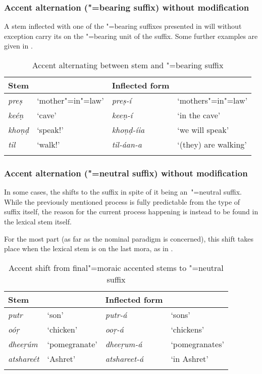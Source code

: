 \subsubsection*{Accent alternation ("=bearing suffix) without modification}

A stem inflected with one of the "=bearing suffixes presented in  will without
exception carry its  on the "=bearing unit of the suffix. Some further examples are given in .


\begin{table}[h]
\caption{ Accent alternating between stem and "=bearing suffix}
\begin{tabularx}{\textwidth}{ l@{\hspace{25pt}} Q l@{\hspace{25pt}} Q }
\lsptoprule
Stem &
&
Inflected form &
\\\midrule
\textit{preṣ} &
`mother"=in"=law' &
\textit{preṣ-í} &
`mothers"=in"=law'\\
\textit{keéṇ} &
`cave' &
\textit{keeṇ-í} &
`in the cave'\\
\textit{khoṇḍ} &
`speak!' &
\textit{khoṇḍ-íia} &
`we will speak'\\
\textit{til} &
`walk!' &
\textit{til-áan-a} &
`(they) are walking'\\\lspbottomrule
\end{tabularx}
\label{tab:3-8}
\end{table}

\subsubsection*{Accent alternation ("=neutral suffix) without modification}

In some cases, the  shifts to the suffix in spite of it being an~"=neutral suffix. While
the previously mentioned process is fully predictable from the type of suffix itself, the reason for
the current process happening is instead to be found in the lexical stem itself.


For the most part (as far as the nominal paradigm is concerned), this shift takes place when the
lexical stem  is on the last mora, as in .



\begin{table}[p] 
\caption{ Accent shift from final"=moraic accented stems to "=neutral suffix}
\begin{tabularx}{\textwidth}{XXXX}
\lsptoprule
Stem &
&
Inflected form &
\\\midrule
\textit{putr} &
`son' &
\textit{putr-á} &
`sons'\\
\textit{oóṛ} &
`chicken' &
\textit{ooṛ-á} &
`chickens'\\
\textit{dheeṛúm} &
`pomegranate' &
\textit{dheeṛum-á} &
`pomegranates'\\
\textit{atshareét} &
`Ashret' &
\textit{atshareet-á} &
`in Ashret'\\\lspbottomrule
\end{tabularx}
\label{tab:3-9}
\end{table}


